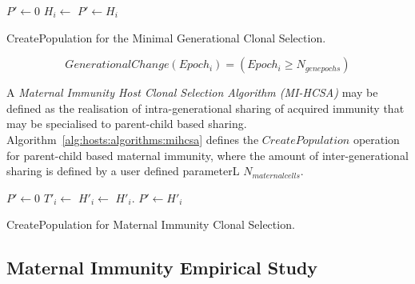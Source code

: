 \begin{algorithm}[htp]
  \SetLine
  
	
	$P\prime \leftarrow$0\;
	{
		$H_i \leftarrow$ \CreateHost{}\;
		$P\prime \leftarrow H_i$\;
	}
	\;
	\caption{CreatePopulation for the Minimal Generational Clonal Selection.}
	\label{alg:hosts:algorithms:ghcsa:mghcsa}
\end{algorithm}


\begin{equation}
	GenerationalChange(Epoch_i) = \left(Epoch_i \geq N_{genepochs} \right)
	\label{eq:hosts:algorithms:generationalchange}
\end{equation}

A \emph{Maternal Immunity Host Clonal Selection Algorithm (MI-HCSA)} may be defined as the realisation of intra-generational sharing of acquired immunity that may be specialised to parent-child based sharing. Algorithm~\ref{alg:hosts:algorithms:mihcsa} defines the $CreatePopulation$ operation for parent-child based maternal immunity, where the amount of inter-generational sharing is defined by a user defined parameterL $N_{maternalcells}$. 

\begin{algorithm}[htp]
  \SetLine
  
		
	$P\prime \leftarrow$0\;
	{
		$T\prime_i \leftarrow$ \; 
		$H\prime_i \leftarrow$ \CreateHost{}\;
		$H\prime_i$.\;
		$P\prime \leftarrow H\prime_i$\;
	}
	\;
	\caption{CreatePopulation for Maternal Immunity Clonal Selection.}
	\label{alg:hosts:algorithms:mihcsa}
\end{algorithm}

%
%
\subsection{Maternal Immunity Empirical Study}
\label{sec:hosts:generational:maternal:study}
%
%
